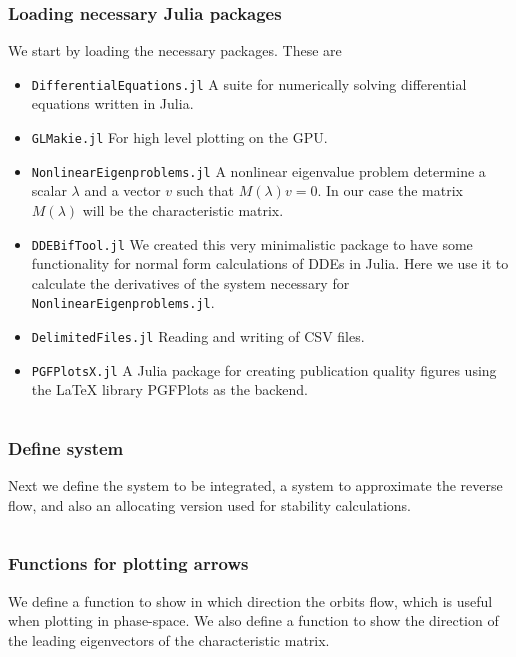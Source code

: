 \subsubsection{Loading necessary Julia packages}
We start by loading the necessary packages. These are
\begin{itemize}
    \item {\tt DifferentialEquations.jl} A suite for numerically solving differential equations written in Julia.
    \item {\tt GLMakie.jl} For high level plotting on the GPU.
    \item {\tt NonlinearEigenproblems.jl} A nonlinear eigenvalue problem determine a scalar $\lambda$ and a vector $v$ such that $M(\lambda)v=0$. In our case the matrix $M(\lambda)$ will be the characteristic matrix.
    \item {\tt DDEBifTool.jl} We created this very minimalistic package to have some functionality for normal form calculations of DDEs in Julia. Here we use it to calculate the derivatives of the system necessary for {\tt NonlinearEigenproblems.jl}.
    \item {\tt DelimitedFiles.jl} Reading and writing of CSV files.
    \item {\tt PGFPlotsX.jl} A Julia package for creating publication quality figures using the LaTeX library PGFPlots as the backend.
\end{itemize}
\newcommand\pathToJuliaFiles{simulation}
\inputminted[firstline=1, lastline=8]{julia}{\pathToJuliaFiles/predator_prey_simulation_article.jl}

\subsubsection{Define system}
Next we define the system to be integrated, a system to approximate the reverse
flow, and also an allocating version used for stability calculations.
\inputminted[firstline=10, lastline=38]{julia}{\pathToJuliaFiles/predator_prey_simulation_article.jl}

\subsubsection{Functions for plotting arrows} \label{sm:eq:arrow_functions}
We define a function to show in which direction the orbits flow, which is
useful when plotting in phase-space. We also define a function to show the
direction of the leading eigenvectors of the characteristic matrix.


